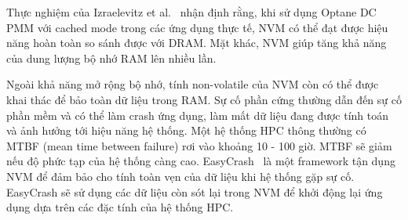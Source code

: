 Thực nghiệm của Izraelevitz et
al.~\cite{izraelevitzBasicPerformanceMeasurements2019} nhận định rằng, khi sử
dụng Optane DC PMM với cached mode trong các ứng dụng thực tế, NVM có thể đạt
được hiệu năng hoàn toàn so sánh được với DRAM. Mặt khác, NVM giúp tăng khả năng
của dung lượng bộ nhớ RAM lên nhiều lần.

Ngoài khả năng mở rộng bộ nhớ, tính non-volatile của NVM còn có thể được khai
thác để bảo toàn dữ liệu trong RAM. Sự cố phần cứng thường dẫn đến sự cố phần
mềm và có thể làm crash ứng dụng, làm mất dữ liệu đang được tính toán và ảnh
hưởng tới hiệu năng hệ thống. Một hệ thống HPC thông thường có MTBF (mean time
between failure) rơi vào khoảng 10 - 100 giờ. MTBF sẽ giảm nếu độ phức tạp của
hệ thống càng cao. EasyCrash~\cite{renExploringNonVolatilityNonVolatile2020} là
một framework tận dụng NVM để đảm bảo cho tính toàn vẹn của dữ liệu khi hệ thống
gặp sự cố. EasyCrash sẽ sử dụng các dữ liệu còn sót lại trong NVM để khởi động
lại ứng dụng dựa trên các đặc tính của hệ thống HPC.
